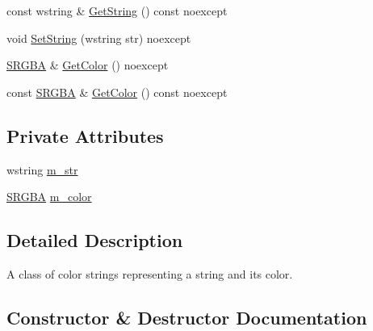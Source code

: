 \begin{DoxyCompactItemize}
\item 
const wstring \& \hyperlink{classmage_1_1rendering_1_1_color_string_a146cf063553b65b3cd854417b638b533}{Get\+String} () const noexcept
\item 
void \hyperlink{classmage_1_1rendering_1_1_color_string_aefee43f68f87617976f89430bac71fba}{Set\+String} (wstring str) noexcept
\item 
\hyperlink{structmage_1_1_s_r_g_b_a}{S\+R\+G\+BA} \& \hyperlink{classmage_1_1rendering_1_1_color_string_a565834879d191509832660f39a923df3}{Get\+Color} () noexcept
\item 
const \hyperlink{structmage_1_1_s_r_g_b_a}{S\+R\+G\+BA} \& \hyperlink{classmage_1_1rendering_1_1_color_string_ace4b3cfddb63732bfff9ced9f1078a26}{Get\+Color} () const noexcept
\end{DoxyCompactItemize}
\subsection*{Private Attributes}
\begin{DoxyCompactItemize}
\item 
wstring \hyperlink{classmage_1_1rendering_1_1_color_string_a226202625fbe205d78e1412310a49f1f}{m\+\_\+str}
\item 
\hyperlink{structmage_1_1_s_r_g_b_a}{S\+R\+G\+BA} \hyperlink{classmage_1_1rendering_1_1_color_string_a5b601126d5067469b05a0e33450b950c}{m\+\_\+color}
\end{DoxyCompactItemize}


\subsection{Detailed Description}
A class of color strings representing a string and its color. 

\subsection{Constructor \& Destructor Documentation}
\hypertarget{classmage_1_1rendering_1_1_color_string_a380bcff4ce39fa09e68626b7aeb975b2}{}\label{classmage_1_1rendering_1_1_color_string_a380bcff4ce39fa09e68626b7aeb975b2} 
